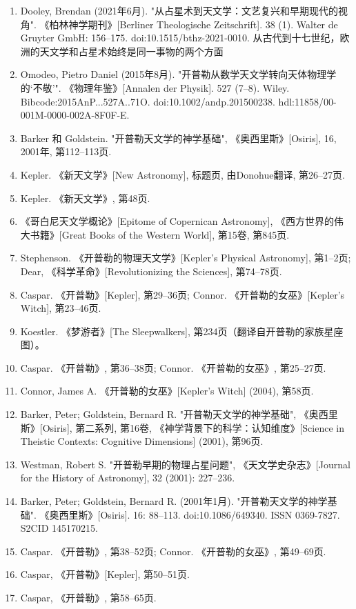 \begin{enumerate}
\item Dooley, Brendan (2021年6月). "从占星术到天文学：文艺复兴和早期现代的视角". 《柏林神学期刊》[Berliner Theologische Zeitschrift]. 38 (1). Walter de Gruyter GmbH: 156–175. doi:10.1515/bthz-2021-0010. 从古代到十七世纪，欧洲的天文学和占星术始终是同一事物的两个方面
\item Omodeo, Pietro Daniel (2015年8月). "开普勒从数学天文学转向天体物理学的‘不敬’". 《物理年鉴》[Annalen der Physik]. 527 (7–8). Wiley. Bibcode:2015AnP...527A..71O. doi:10.1002/andp.201500238. hdl:11858/00-001M-0000-002A-8F0F-E.
\item Barker 和 Goldstein. "开普勒天文学的神学基础", 《奥西里斯》[Osiris], 16, 2001年, 第112–113页.
\item Kepler. 《新天文学》[New Astronomy], 标题页, 由Donohue翻译, 第26–27页.
\item Kepler. 《新天文学》, 第48页.
\item 《哥白尼天文学概论》[Epitome of Copernican Astronomy], 《西方世界的伟大书籍》[Great Books of the Western World], 第15卷, 第845页.
\item Stephenson. 《开普勒的物理天文学》[Kepler's Physical Astronomy], 第1–2页; Dear, 《科学革命》[Revolutionizing the Sciences], 第74–78页.
\item Caspar. 《开普勒》[Kepler], 第29–36页; Connor. 《开普勒的女巫》[Kepler's Witch], 第23–46页.
\item Koestler. 《梦游者》[The Sleepwalkers], 第234页（翻译自开普勒的家族星座图）。
\item Caspar. 《开普勒》, 第36–38页; Connor. 《开普勒的女巫》, 第25–27页.
\item Connor, James A. 《开普勒的女巫》[Kepler's Witch] (2004), 第58页.
\item Barker, Peter; Goldstein, Bernard R. "开普勒天文学的神学基础", 《奥西里斯》[Osiris], 第二系列, 第16卷, 《神学背景下的科学：认知维度》[Science in Theistic Contexts: Cognitive Dimensions] (2001), 第96页.
\item Westman, Robert S. "开普勒早期的物理占星问题", 《天文学史杂志》[Journal for the History of Astronomy], 32 (2001): 227–236.
\item Barker, Peter; Goldstein, Bernard R. (2001年1月). "开普勒天文学的神学基础". 《奥西里斯》[Osiris]. 16: 88–113. doi:10.1086/649340. ISSN 0369-7827. S2CID 145170215.
\item Caspar. 《开普勒》, 第38–52页; Connor. 《开普勒的女巫》, 第49–69页.
\item Caspar, 《开普勒》[Kepler], 第50–51页.
\item Caspar, 《开普勒》, 第58–65页.

\end{enumerate}
